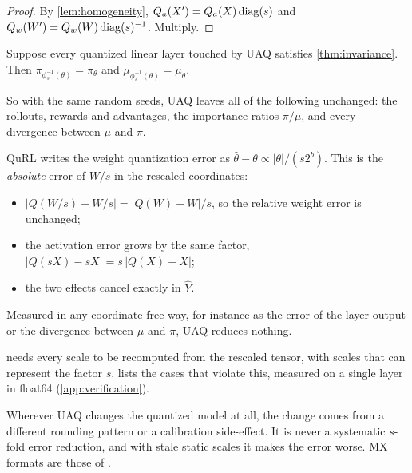 \begin{proof}
By \cref{lem:homogeneity}, $Q_a(X')=Q_a(X)\operatorname{diag}(s)$ and $Q_w(W')=Q_w(W)\operatorname{diag}(s)^{-1}$. Multiply.
\end{proof}

\begin{corollary}\label{cor:rollout}
Suppose every quantized linear layer touched by UAQ satisfies \cref{thm:invariance}. Then $\pi_{\phi_s^{-1}(\theta)}=\pi_\theta$ and $\mu_{\phi_s^{-1}(\theta)}=\mu_\theta$.

So with the same random seeds, UAQ leaves all of the following unchanged: the rollouts, rewards and advantages, the importance ratios $\pi/\mu$, and every divergence between $\mu$ and $\pi$.
\end{corollary}

\begin{remark}\label{rem:paper-formula}
QuRL writes the weight quantization error as $\hat\theta-\theta\propto|\theta|/(s2^b)$. This is the \emph{absolute} error of $W/s$ in the rescaled coordinates:
\begin{itemize}[leftmargin=*,itemsep=1pt]
\item $|Q(W/s)-W/s|=|Q(W)-W|/s$, so the relative weight error is unchanged;
\item the activation error grows by the same factor, $|Q(sX)-sX|=s\,|Q(X)-X|$;
\item the two effects cancel exactly in $\hat Y$.
\end{itemize}
Measured in any coordinate-free way, for instance as the error of the layer output or the divergence between $\mu$ and $\pi$, UAQ reduces nothing.
\end{remark}

\begin{remark}\label{rem:scope}
 needs every scale to be recomputed from the rescaled tensor, with scales that can represent the factor $s$.  lists the cases that violate this, measured on a single layer in float64 (\cref{app:verification}).

Wherever UAQ changes the quantized model at all, the change comes from a different rounding pattern or a calibration side-effect. It is never a systematic $s$-fold error reduction, and with stale static scales it makes the error worse. MX formats are those of \citet{rouhani2023mx}.
\end{remark}

